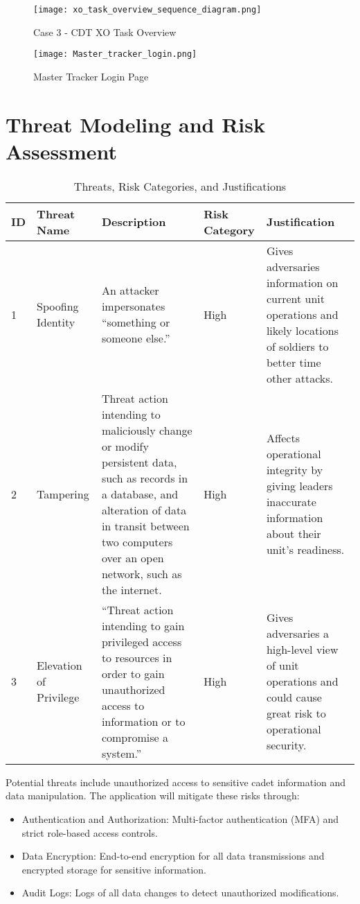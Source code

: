 \documentclass [11pt]{article}
\begin{document}
\begin{figure}[H]
    \centering
    \texttt{[image: xo\_task\_overview\_sequence\_diagram.png]}
    \caption{Case 3 - CDT XO Task Overview}
    \label{fig:seq_dia2}
\end{figure}

\begin{figure}[H]
    \centering
    \texttt{[image: Master\_tracker\_login.png]}
    \caption{Master Tracker Login Page}
    \label{fig:enter-label}
\end{figure}

\section{Threat Modeling and Risk Assessment}

\begin{table}[H]
\centering
\begin{tabular}{|p{1cm}|p{4cm}|p{5cm}|p{1.5cm}|p{4.5cm}|}
\hline
\textbf{ID} & \textbf{Threat Name} & \textbf{Description} & \textbf{Risk Category} & \textbf{Justification} \\
\hline
1 & Spoofing Identity & An attacker impersonates “something or someone else.” & High & Gives adversaries information on current unit operations and likely locations of soldiers to better time other attacks. \\
\hline
2 & Tampering & Threat action intending to maliciously change or modify persistent data, such as records in a database, and alteration of data in transit between two computers over an open network, such as the internet. & High & Affects operational integrity by giving leaders inaccurate information about their unit’s readiness. \\
\hline
3 & Elevation of Privilege & “Threat action intending to gain privileged access to resources in order to gain unauthorized access to information or to compromise a system.” & High & Gives adversaries a high-level view of unit operations and could cause great risk to operational security. \\
\hline
\end{tabular}
\caption{Threats, Risk Categories, and Justifications}
\end{table}

Potential threats include unauthorized access to sensitive cadet information and data manipulation. The application will mitigate these risks through: 
\begin{itemize}
    \item Authentication and Authorization: Multi-factor authentication (MFA) and strict role-based access controls. 
    \item Data Encryption: End-to-end encryption for all data transmissions and encrypted storage for sensitive information. 
    \item Audit Logs: Logs of all data changes to detect unauthorized modifications. 
\end{itemize}
\end{document}
